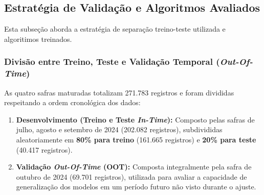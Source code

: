 \begin{table}[H]
\centering
\caption{Cronograma de safras, janelas temporais, volumetria e taxa de \textit{churn}}
\label{tab:resumo_safras}
\end{table}

\subsection{Estratégia de Validação e Algoritmos Avaliados}\label{subsec:validacao_algoritmos}

Esta subseção aborda a estratégia de separação treino-teste utilizada e algoritimos treinados.

\subsubsection{Divisão entre Treino, Teste e Validação Temporal (\textit{Out-Of-Time})}
As quatro safras maturadas totalizam 271.783 registros e foram divididas respeitando a ordem cronológica dos dados:
\begin{enumerate}[leftmargin=*]
    \item \textbf{Desenvolvimento (Treino e Teste \textit{In-Time}):} Composto pelas safras de julho, agosto e setembro de 2024 (202.082 registros), subdivididas aleatoriamente em \textbf{80\% para treino} (161.665 registros) e \textbf{20\% para teste} (40.417 registros).
    \item \textbf{Validação \textit{Out-Of-Time} (OOT):} Composta integralmente pela safra de outubro de 2024 (69.701 registros), utilizada para avaliar a capacidade de generalização dos modelos em um período futuro não visto durante o ajuste.
\end{enumerate}

